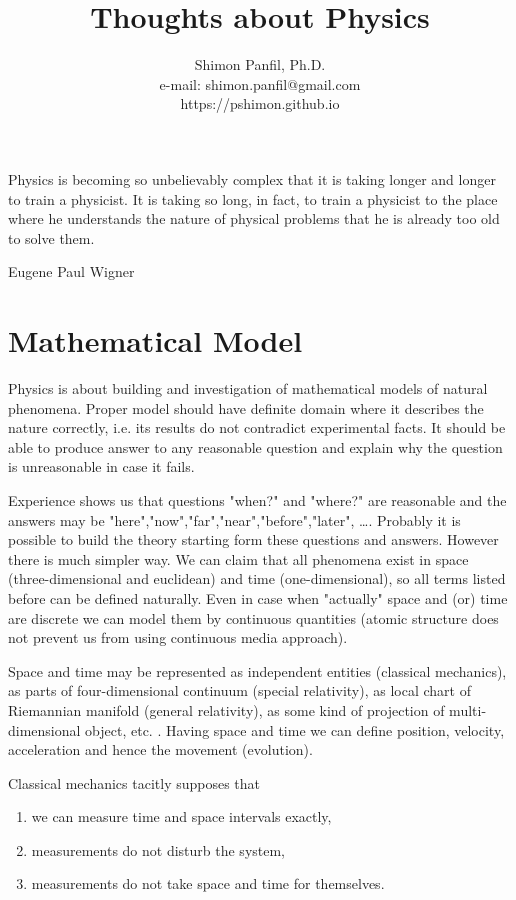 \documentclass[11pt]{report}
\title{Thoughts about Physics}
\author{Shimon Panfil, Ph.D.\\
e-mail: shimon.panfil@gmail.com\\
https://pshimon.github.io}
\begin{document}
  

\maketitle
\epigraph{Physics is becoming so unbelievably complex that it is taking longer
and longer to train a physicist. It is taking so long, in fact, to train a 
physicist to the place where he understands the nature of physical problems that 
he is already too old to solve them.}{Eugene Paul Wigner}
\tableofcontents                        
\chapter{Mathematical Model }
\label {math-mod}
Physics is about building and investigation of mathematical models  of natural phenomena. 
Proper model should have definite domain where it describes the nature correctly, i.e.
its results do not contradict experimental facts. It should be able to produce answer
to any reasonable question and explain why the question is unreasonable in case it fails.

Experience shows us that questions "when?" and "where?" are reasonable and the answers may be
"here","now","far","near","before","later", \ldots . Probably it is possible to build 
the theory starting form these questions and answers. However there is much simpler way.
We can claim that all phenomena exist in space (three-dimensional and euclidean) 
and time (one-dimensional), so all terms listed before can be defined naturally.
Even in case when "actually" space and (or) time are discrete we can model them
by continuous quantities (atomic structure does not prevent us from using
continuous media approach).

Space and time may be represented as independent entities (classical mechanics), as parts of 
four-dimensional continuum (special relativity), as local chart
of Riemannian manifold (general relativity), as some kind of projection
of multi-dimensional object, etc. . Having space and time we can define position, velocity, acceleration  and hence the movement (evolution).

Classical mechanics tacitly supposes that
\begin{enumerate}
    \item we can measure time and space intervals exactly,
    \item measurements do not disturb the system,
    \item measurements do not take space and time for themselves.
\end{enumerate}
\end{document}
